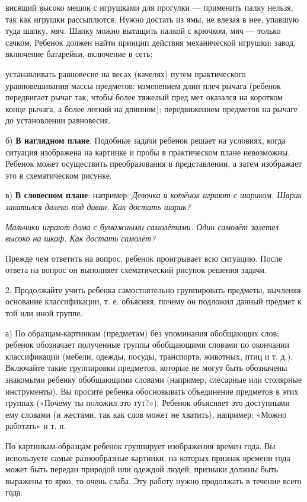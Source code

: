 \documentclass[a5paper]{book}
\renewcommand{\emph}[1]{\textit{#1}}
\begin{document}
висящий высоко мешок с игрушками для прогулки --- применить палку
нельзя, так как игрушки рассыплются. Нужно достать из ямы, не влезая в
нее, упавшую туда шапку, мяч. Шапку можно вытащить палкой с крючком, мяч
--- только сачком. Ребенок должен найти принцип действия механической
игрушки: завод, включение батарейки, включение в сеть;

устанавливать равновесие на весах (качелях) путем практического
уравновешивания массы предметов: изменением длин плеч рычага (ребенок
передвигает рычаг так, чтобы более тяжелый пред мет оказался на коротком
конце рычага, а более легкий на длинном); передвижением предметов на
рычаге до установлении равновесия.

б) \textbf{В наглядном плане}. Подобные задачи ребенок решает на
условиях, когда ситуация изображена на картинке и пробы в практическом
плане невозможны. Ребенок может осуществить преобразования в
представлении, а затем изображает это в схематическом рисунке.

в) \textbf{В словесном плане}: например: \emph{Девочка и котёнок играют
с шариком. Шарик закатился далеко под диван. Как достать шарик?}

\emph{Мальчики играют дома с бумажными самолётами. Один самолёт залетел
высоко на шкаф. Как достать самолёт?}

Прежде чем ответить на вопрос, ребенок проигрывает всю ситуацию. После
ответа на вопрос он выполняет схематический рисунок решения задачи.

2. Продолжайте учить ребенка самостоятельно группировать предметы,
вычленяя основание классификации, т. е. объясняя, почему он подложил
данный предмет к той или иной группе.

а) По образцам-картинкам (предметам) без упоминания обобщающих слов;
ребенок обозначает полученные группы обобщающими словами по окончании
классификации (мебели, одежды, посуды, транспорта, животных, птиц и т.
д.). Включайте такие группировки предметов, которые не могут быть
обозначены знакомыми ребенку обобщающими словами (например, слесарные
или столярные инструменты). Вы просите ребенка обосновывать объединение
предметов в этих группах («Почему ты положил это тут?»). Ребенок
объясняет это доступными ему словами (и жестами, так как слов может не
хватить), например: «Можно работать» и т. п.

По картинкам-образцам ребенок группирует изображения времен года. Вы
используете самые разнообразные картинки, на которых признак времени
года может быть передан природой или одеждой людей; признаки должны быть
выражены то ярко, то очень слаба. Эту работу нужно продолжать в течение
всего года.
\end{document}
